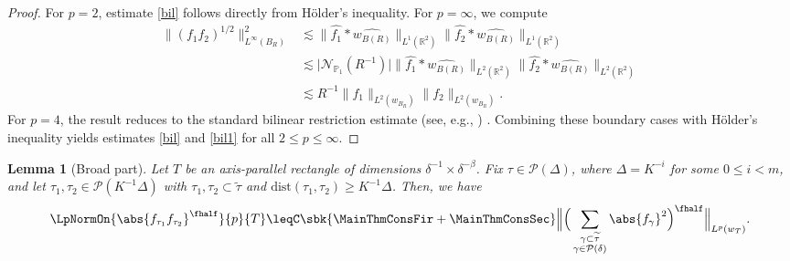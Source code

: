 \documentclass[reqno,centertags,11pt,a4paper]{amsart}
\newtheorem{lemma}[definition]{Lemma}
\begin{document}
\begin{proof}
For $p=2$, estimate \eqref{bil} follows directly from H\"older's inequality. For $p=\infty$, we compute
\begin{align*}
\|(f_1f_2)^{1/2}\|_{L^\infty(B_R)}^2
&\lesssim\bigg\|\widehat{f_1}*\widehat{w_{B(R)}}\bigg\|_{L^1(\mathbb{R}^2)}\bigg\|\widehat{f_2}*\widehat{w_{B(R)}}\bigg\|_{L^1(\mathbb{R}^2)}\\
&\lesssim\bigl|\mathcal{N}_{\mathbb{P}_1}(R^{-1})\bigr|\bigg\|\widehat{f_1}*\widehat{w_{B(R)}}\bigg\|_{L^2(\mathbb{R}^2)}\bigg\|\widehat{f_2}*\widehat{w_{B(R)}}\bigg\|_{L^2(\mathbb{R}^2)}\\
&\lesssim R^{-1}\|f_1\|_{L^2(w_{B_R})}\|f_2\|_{L^2(w_{B_R})}.
\end{align*}
For $p=4$, the result reduces to the standard bilinear restriction estimate (see, e.g., \cite[Lemma 2.4]{Lee04}) . Combining these boundary cases with H\"older's inequality yields estimates \eqref{bil} and \eqref{bil1} for all $2\leq p\leq\infty$.
\end{proof}
\begin{lemma}[Broad part]
\label{Broad esti}
Let $T$ be an axis-parallel rectangle of dimensions $\delta^{-1} \times \delta^{-\beta}$. Fix $\tau\in\mathcal{P}(\Delta)$, where $\Delta=K^{-i}$ for some $0\leq i<m$, and let $\tau_1,\tau_2\in \mathcal{P}(K^{-1}\Delta)$ with $\tau_1,\tau_2\subset\widetilde{\tau}$ and $\text{dist}(\tau_1,\tau_2) \geq  K^{-1}\Delta$. Then, we have
\[ \LpNormOn{\abs{f_{\tau_1}f_{\tau_2}}^\fhalf}{p}{T}  \leqC \sbk{\MainThmConsFir+\MainThmConsSec}  \Big\| \Big(\sum_{ \substack{ \gamma \subset \widetilde{\tau} \\ \gamma \in \mathcal{P}(\delta) }  } \abs{f_\gamma}^2 \Big)^\fhalf\Big\|_{L^p({w_T})}.\]
 \end{lemma}
\end{document}
